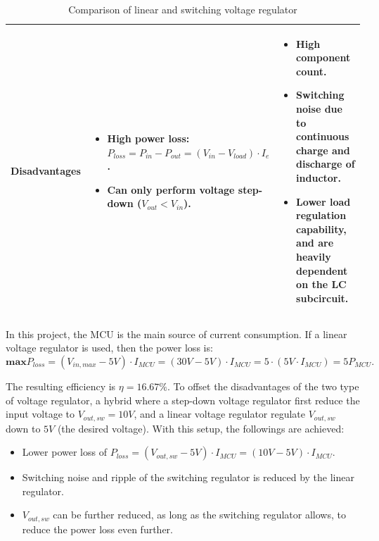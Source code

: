 \documentclass[../main.tex]{subfiles}
\begin{document}
\begin{table}[!h]
\begin{tabular}{|m{0.1\linewidth}|m{0.45\linewidth}|m{0.45\linewidth}|}
        \hline
        Disadvantages & 

        \begin{itemize}
            \item High power loss: \newline $P_{loss} = P_{in} - P_{out} = (V_{in} - V_{load}) \cdot I_{e}$.
            \item Can only perform voltage step-down ($V_{out} < V_{in}$).
        \end{itemize} &
        
        \begin{itemize}
            \item High component count.
            \item Switching noise due to continuous charge and discharge of inductor.
            \item Lower load regulation capability, and are heavily dependent on the LC subcircuit. 
        \end{itemize}  \\

        \hline     
        \end{tabular}
        \caption{Comparison of linear and switching voltage regulator}
        \label{table:voltage_regulator_type}
    \end{table}

    \pagebreak
    \justify
    In this project, the MCU is the main source of current consumption. If a linear voltage regulator is used, then the power loss is:
    \begin{equation}
        \textbf{max}P_{loss} = (V_{in,max} - 5V) \cdot I_{MCU} = (30V - 5V) \cdot I_{MCU} = 5 \cdot (5V\cdot I_{MCU}) = 5P_{MCU}.
    \end{equation}  

    \justify
    The resulting efficiency is $\eta = 16.67\%$. To offset the disadvantages of the two type of voltage regulator, a hybrid where a step-down voltage regulator first reduce the input voltage to $V_{out,sw}=10V$, and a linear voltage regulator regulate $V_{out,sw}$ down to $5V$ (the desired voltage). With this setup, the followings are achieved:
    \begin{itemize}
        \item Lower power loss of $P_{loss} = (V_{out,sw} - 5V) \cdot I_{MCU} = (10V - 5V) \cdot I_{MCU}$.
        \item Switching noise and ripple of the switching regulator is reduced by the linear regulator. 
        \item $V_{out,sw}$ can be further reduced, as long as the switching regulator allows, to reduce the power loss even further.
    \end{itemize}
\end{document}
